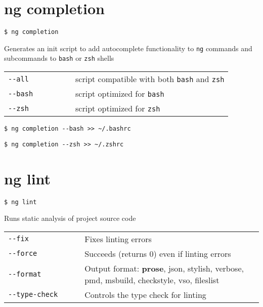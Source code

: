 \documentclass[8pt]{extarticle} %
\begin{document}
\begin{multicols}{3}
\section*{ng completion}

  \vspace{1ex}
  {\tt \$ ng completion \itt{[options...]}}

  \vspace{0.6ex}

  {\small Generates an init script to add autocomplete functionality to {\tt ng} commands and subcommands 
  to {\tt bash} or {\tt zsh} shells}

  \vspace{0.6ex}

  \begin{tabular}{L{0.30\linewidth} L{0.70\linewidth}}
    \tt -{}-all  & \small script compatible with both {\tt bash} and {\tt zsh} \\
    \tt -{}-bash & \small script optimized for {\tt bash} \\
    \tt -{}-zsh  & \small script optimized for {\tt zsh}
  \end{tabular}

  \vspace{0.6ex}

  {\tt \$ ng completion -{}-bash >{}> \textasciitilde/.bashrc}

  {\tt \$ ng completion -{}-zsh >{}> \textasciitilde/.zshrc}

\section*{ng lint}

  \vspace{1ex}
  {\tt \$ ng lint \itt{[options...]}}

  \vspace{0.6ex}

  {\small Runs static analysis of project source code}

  \begin{tabular}{L{0.30\linewidth} L{0.70\linewidth}}
    \tt -{}-fix  & \small Fixes linting errors \\
    \tt -{}-force  & \small Succeeds (returns 0) even if linting errors \\
    \tt -{}-format & \small Output format: {\bf prose}, json, stylish, verbose, pmd, msbuild, checkstyle, vso, fileslist \\
    \tt -{}-type-check & \small Controls the type check for linting
  \end{tabular}


\end{multicols}
\end{document}
